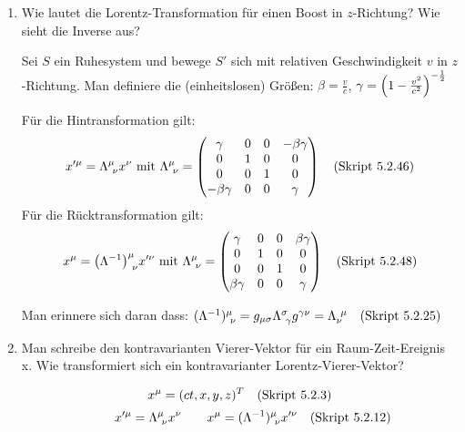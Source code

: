 \begin{enumerate}
  \item Wie lautet die Lorentz-Transformation für einen Boost in 
    $z$-Richtung? Wie sieht die Inverse aus?
    
    Sei $S$ ein Ruhesystem und bewege $S'$ sich mit relativen 
    Geschwindigkeit $v$ in $z$-Richtung. Man definiere die (einheitslosen)
    Größen:
    $\beta = \frac{v}{c}$, $\gamma=\qty(1-\frac{v^2}{c^2})^{-\frac{1}{2}}$
    
    Für die Hintransformation gilt:
    \begin{equation*}
      x'^\mu = \Lambda^\mu_{\ \nu} x^\nu 
      \text{ mit } 
      \Lambda^\mu_{\ \nu}=
      \begin{pmatrix}
        \gamma       & 0 & 0 & -\beta\gamma\\
        0            & 1 & 0 & 0           \\
        0            & 0 & 1 & 0           \\
        -\beta\gamma & 0 & 0 & \gamma      \\
      \end{pmatrix}
      \quad\text{(Skript 5.2.46)}
    \end{equation*}
    Für die Rücktransformation gilt:
    \begin{equation*}
      x^\mu = \qty(\Lambda^{-1})^\mu_{\ \nu} x'^\nu 
      \text{ mit } 
      \Lambda^\mu_{\ \nu}=
      \begin{pmatrix}
        \gamma       & 0 & 0 & \beta\gamma\\
        0            & 1 & 0 & 0           \\
        0            & 0 & 1 & 0           \\
        \beta\gamma  & 0 & 0 & \gamma      \\
      \end{pmatrix}
      \quad\text{(Skript 5.2.48)}
    \end{equation*}

    Man erinnere sich daran dass:
      $(\Lambda^{-1})^\mu_{\ \nu}
      =g_{\mu\sigma}\Lambda^{\sigma}_{\ \gamma}g^{\gamma\nu}
      =\Lambda_{\nu}^{\ \mu}
      \quad\text{(Skript 5.2.25)}$

    \item Man schreibe den kontravarianten Vierer-Vektor für ein
      Raum-Zeit-Ereignis x. Wie transformiert sich ein kontravarianter
      Lorentz-Vierer-Vektor?

      \begin{equation*}
        x^\mu =
        (ct, x, y, z)^T
        \quad\text{(Skript 5.2.3)}
      \end{equation*}
      \begin{equation*}
      \qquad x'^\mu = \Lambda^\mu_{\ \nu} x^\nu 
      \qquad x^\mu = (\Lambda^{-1})^\mu_{\ \nu} x'^\nu 
      \quad\text{(Skript 5.2.12)}
      \end{equation*}


\end{enumerate}
